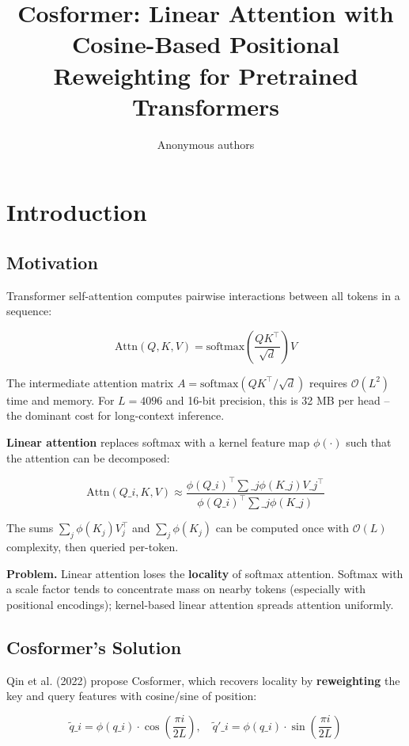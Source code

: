 \title{\textbf{Cosformer: Linear Attention with Cosine-Based Positional Reweighting for Pretrained Transformers}}

\author{Anonymous authors}



\section{Introduction}

\subsection{Motivation}

Transformer self-attention computes pairwise interactions between all tokens 
in a sequence:

\[
\text{Attn}(Q, K, V) = \text{softmax}\!\left(\frac{QK^\top}{\sqrt{d}}\right)V
\]

The intermediate attention matrix $A = \text{softmax}(QK^\top / \sqrt{d})$ 
requires $\mathcal{O}(L^2)$ time and memory. For $L = 4096$ and 16-bit 
precision, this is 32 MB per head -- the dominant cost for long-context 
inference.

\textbf{Linear attention} replaces softmax with a kernel feature map 
$\phi(\cdot)$ such that the attention can be decomposed:

\[
\text{Attn}(Q\_i, K, V) \approx \frac{\phi(Q\_i)^\top \sum\_j \phi(K\_j) V\_j^\top}{\phi(Q\_i)^\top \sum\_j \phi(K\_j)}
\]

The sums $\sum_j \phi(K_j) V_j^\top$ and $\sum_j \phi(K_j)$ can be computed 
once with $\mathcal{O}(L)$ complexity, then queried per-token.

\textbf{Problem.} Linear attention loses the \textbf{locality} of softmax attention. 
Softmax with a scale factor tends to concentrate mass on nearby tokens 
(especially with positional encodings); kernel-based linear attention 
spreads attention uniformly.

\subsection{Cosformer's Solution}

Qin et al. (2022) propose Cosformer, which recovers locality by 
\textbf{reweighting} the key and query features with cosine/sine of position:

\[
\tilde{q}\_i = \phi(q\_i) \cdot \cos\!\left(\frac{\pi i}{2 L}\right), \quad
\tilde{q}'\_i = \phi(q\_i) \cdot \sin\!\left(\frac{\pi i}{2 L}\right)
\]

